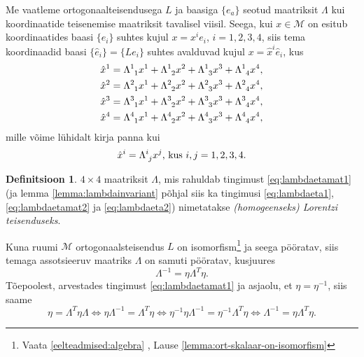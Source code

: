 \documentclass[a4paper,12pt]{article}
\theoremstyle{plain}
\theoremstyle{definition}
\newtheorem{definitsioon}{Definitsioon}[section]
\numberwithin{equation}{section}
\begin{document}
Me vaatleme ortogonaalteisendusega $L$ ja baasiga $\{e_a\}$ seotud maatriksit $\Lambda$ kui koordinaatide teisenemise maatriksit tavalisel viisil. Seega, kui $x \in \mathcal{M}$ on esitub koordinaatides baasi $\{e_i\}$ suhtes kujul $x = x^i e_i$, $i = 1, 2, 3, 4$, siis tema koordinaadid baasi $\{\hat{e}_i\} = \{Le_i\}$ suhtes avalduvad kujul $x = \hat{x}^i \hat{e}_i$, kus
\begin{align*}
\hat{x}^1 &= \Lambda\indices{^1_1} x^1 + \Lambda\indices{^1_2} x^2 + \Lambda\indices{^1_3} x^3 + \Lambda\indices{^1_4} x^4, \\
\hat{x}^2 &= \Lambda\indices{^2_1} x^1 + \Lambda\indices{^2_2} x^2 + \Lambda\indices{^2_3} x^3 + \Lambda\indices{^2_4} x^4, \\
\hat{x}^3 &= \Lambda\indices{^3_1} x^1 + \Lambda\indices{^3_2} x^2 + \Lambda\indices{^3_3} x^3 + \Lambda\indices{^3_4} x^4, \\
\hat{x}^4 &= \Lambda\indices{^4_1} x^1 + \Lambda\indices{^4_2} x^2 + \Lambda\indices{^4_3} x^3 + 
\Lambda\indices{^4_4} x^4,
\end{align*}
mille võime lühidalt kirja panna kui
\begin{equation*}
\hat{x}^i = \Lambda\indices{^i_j} x^j \text{, kus } i,j=1, 2, 3, 4.
\end{equation*}

\begin{definitsioon}
$4 \times 4$ maatriksit $\Lambda$, mis rahuldab tingimust \ref{eq:lambdaetamat1} (ja lemma \ref{lemma:lambdainvariant} põhjal siis ka tingimusi \ref{eq:lambdaeta1}, \ref{eq:lambdaetamat2} ja \ref{eq:lambdaeta2}) nimetatakse \emph{(homogeenseks) Lorentzi teisenduseks}.
\end{definitsioon}

Kuna ruumi $\mathcal{M}$ ortogonaalsteisendus $L$ on isomorfism\footnote{{Vaata \ref{eelteadmised:algebra} , Lause \ref{lemma:ort-skalaar-on-isomorfism}}} 
ja seega pööratav, siis temaga assotsieeruv maatriks $\Lambda$ on samuti pööratav, kusjuures
\begin{equation} \label{eq:lambda-1lambda-trans}
\Lambda^{-1} = \eta \Lambda^T \eta.
\end{equation}
Tõepoolest, arvestades tingimust \ref{eq:lambdaetamat1} ja asjaolu, et $\eta = \eta^{-1}$, siis saame
\begin{equation*}
\eta = \Lambda^T \eta \Lambda \iff \eta \Lambda^{-1} = \Lambda^T \eta \iff \eta^{-1} \eta \Lambda^{-1} = \eta^{-1} \Lambda^T \eta \iff \Lambda^{-1} = \eta \Lambda^T \eta.
\end{equation*}
\end{document}
